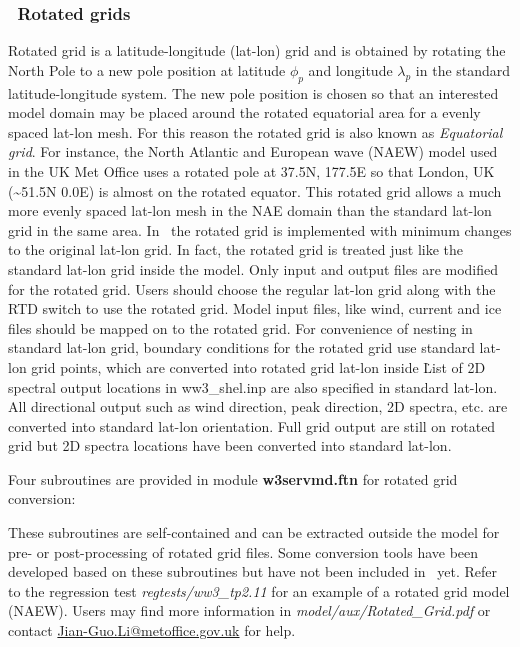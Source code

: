 \vssub
\subsubsection{~Rotated grids} \label{sub:num_space_rotagrid}

\noindent
Rotated grid is a latitude-longitude (lat-lon) grid and is obtained by
rotating the North Pole to a new pole position at latitude $\phi_{p}$ and
longitude $\lambda_{p}$ in the standard latitude-longitude system.  The new
pole position is chosen so that an interested model domain may be placed
around the rotated equatorial area for a evenly spaced lat-lon mesh. For this
reason the rotated grid is also known as \emph{Equatorial grid}. For instance,
the North Atlantic and European wave (NAEW) model used in the UK Met Office
uses a rotated pole at 37.5N, 177.5E so that London, UK
(\textasciitilde{}51.5N 0.0E) is almost on the rotated equator. This rotated
grid allows a much more evenly spaced lat-lon mesh in the NAE domain than the
standard lat-lon grid in the same area. In \ws\, the rotated grid is
implemented with minimum changes to the original lat-lon grid. In fact, the
rotated grid is treated just like the standard lat-lon grid inside the
model. Only input and output files are modified for the rotated grid. Users
should choose the regular lat-lon grid along with the RTD switch to use the
rotated grid. Model input files, like wind, current and ice files should be
mapped on to the rotated grid. For convenience of nesting in standard lat-lon
grid, boundary conditions for the rotated grid use standard lat-lon grid
points, which are converted into rotated grid lat-lon inside \ws\.  List of 2D
spectral output locations in ww3\_shel.inp are also specified in standard
lat-lon. All directional output such as wind direction, peak direction, 2D
spectra, etc. are converted into standard lat-lon orientation. Full grid
output are still on rotated grid but 2D spectra locations have been converted
into standard lat-lon.

Four subroutines are provided in module {\bf w3servmd.ftn} for rotated grid
conversion:
\begin{vlist}
\end{vlist}
These subroutines are self-contained and can be extracted outside the model
for pre- or post-processing of rotated grid files.  Some conversion tools have
been developed based on these subroutines but have not been included in \ws\
yet. Refer to the regression test \emph{regtests/ww3\_tp2.11} for an example
of a rotated grid model (NAEW).  Users may find more information in 
\emph{model/aux/Rotated\_Grid.pdf} or contact \url{Jian-Guo.Li@metoffice.gov.uk} 
for help.

